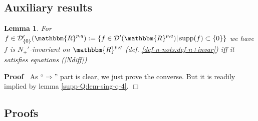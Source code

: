 \documentclass[12pt]{article}
\newcommand{\assign}{:=}
\newcommand{\tmop}[1]{\ensuremath{\operatorname{#1}}}
\renewenvironment{proof}{\noindent\textbf{Proof\ }}{\hspace*{\fill}$\Box$\medskip}
\newtheorem{lemma}[proposition]{Lemma}
\theoremstyle{remark}
\begin{document}
\subsection{Auxiliary results}

\begin{lemma}
  \label{diffSBO:lem-aux}For $f \in \mathcal{D}'_{\{ 0 \}} (\mathbbm{R}^{p,
  q}) \assign \{ f \in \mathcal{D}' (\mathbbm{R}^{p, q}) | \tmop{supp} (f)
  \subset \{ 0 \} \}$ we have $f$ is $N_+'$-invariant on $\mathbbm{R}^{p, q}$
  (def. \ref{def-n-nots:def-n+invar}) iff it satisfies equations (\ref{Ndiff})
\end{lemma}

\begin{proof}
  As ``$\Rightarrow$'' part is clear, we just prove the converse. But it is
  readily implied by lemma \ref{supp-Q:lem-sing-q-4}.
\end{proof}

\subsection{Proofs}
\end{document}
